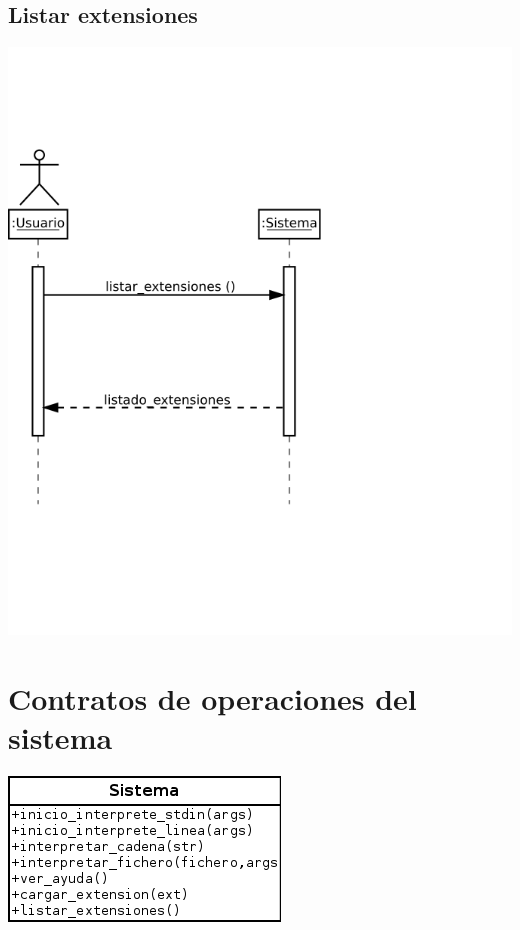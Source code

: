 \subsection{Listar extensiones}
\begin{center}
\includegraphics[scale=0.4]{listar_extensiones.png} \\
\end{center}

\section{Contratos de operaciones del sistema}
\begin{center}
\includegraphics[scale=0.7]{operaciones_sistema.png} \\
\end{center}
